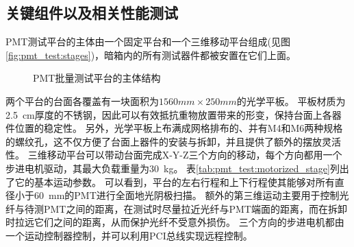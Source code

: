 \subsection{关键组件以及相关性能测试}
\label{sec:pmt_test:testbench_hardware}
PMT测试平台的主体由一个固定平台和一个三维移动平台组成(见图\ref{fig:pmt_test:stages})，暗箱内的所有测试器件都被安置在它们上面。
\begin{figure}[htbp]
	\centering
	\caption{PMT批量测试平台的主体结构}
	\label{fig:blindfigure}
\end{figure}
两个平台的台面各覆盖有一块面积为$1560mm\times250mm$的光学平板。
平板材质为\SI{2.5}{cm}厚度的不锈钢，因此可以有效抵抗重物放置带来的形变，保持台面上各器件位置的稳定性。
另外，光学平板上布满成网格排布的、并有M4和M6两种规格的螺纹孔，这不仅方便了台面上器件的安装与拆卸，并且提供了额外的摆放灵活性。
三维移动平台可以带动台面完成X-Y-Z三个方向的移动，每个方向都用一个步进电机驱动，其最大负载重量为\SI{30}{\kilo\gram}。
表\ref{tab:pmt_test:motorized_stage}列出了它的基本运动参数。
可以看到，平台的左右行程和上下行程使其能够对所有直径小于\SI{60}{\milli\meter}的PMT进行全面地光阴极扫描。
额外的第三维运动主要用于控制光纤与待测PMT之间的距离，在测试时尽量拉近光纤与PMT端面的距离，而在拆卸时拉远它们之间的距离，从而保护光纤不受意外损伤。
三个方向的步进电机都由一个运动控制器控制\cite{leetro}，并可以利用PCI总线实现远程控制。
